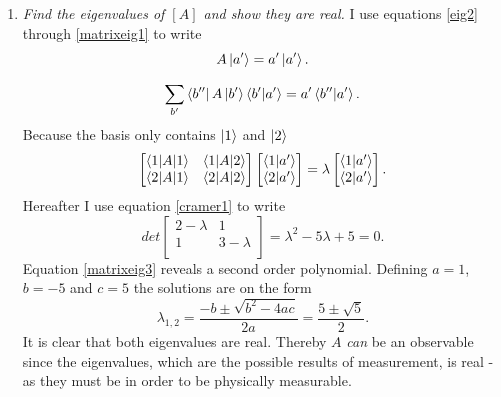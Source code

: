 \begin{example}
\begin{enumerate}
		\item \emph{Find the eigenvalues of $[A]$ and show they are real.}\newline
		I use equations \eqref{eig2} through \eqref{matrixeig1} to write
		\begin{equation}	
			A\ket{a'}=a'\ket{a'}.
		\end{equation} 
		\begin{equation}	
			\sum_{b'}^{}\bra{b''}A\ket{b'}\braket{b'|a'}=a'\braket{b''|a'}.
		\end{equation} 
		Because the basis only contains $\ket{1}$ and $\ket{2}$		
		\begin{equation}
			\begin{bmatrix}
				\braket{1|A|1} & \braket{1|A|2}\\
				\braket{2|A|1} & \braket{2|A|2} \\
			\end{bmatrix}
			\begin{bmatrix}
				\braket{1|a'}\\
				\braket{2|a'}\\
			\end{bmatrix}
			=\lambda\begin{bmatrix}
				\braket{1|a'}\\
				\braket{2|a'}\\
			\end{bmatrix}.
			\label{matrixeig2}
		\end{equation} 
		Hereafter I use equation \eqref{cramer1} to write
		\begin{equation}
			det\begin{bmatrix}
				2-\lambda & 1\\
				1 & 3-\lambda \\
			\end{bmatrix}
			=\lambda^2-5\lambda+5=0.
			\label{matrixeig3}
		\end{equation} 
		Equation \eqref{matrixeig3} reveals a second order polynomial. Defining $a=1$, $b=-5$ and $c=5$ the solutions are on the form
		\begin{equation}
			\lambda_{1,2}=\frac{-b\pm\sqrt{b^2-4ac}}{2a}=\frac{5\pm\sqrt{5}}{2}.
			\label{roots}
		\end{equation} 
		It is clear that both eigenvalues are real. Thereby $A$ \emph{can} be an observable since the eigenvalues, which are the possible results of measurement, is real - as they must be in order to be physically measurable. \newline
		

\end{enumerate}
\end{example}
